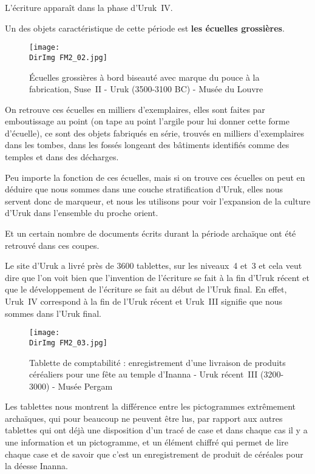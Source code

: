 \documentclass[a4paper,10pt]{article}
\newcommand{\DirImg}{../img/FaivreMartin/}
\begin{document}
L'écriture apparaît dans la phase d'Uruk~IV.

Un des objets caractéristique de cette période est \textbf{les 
écuelles grossières}.

\begin{figure}
  \centering
  \texttt{[image: \\DirImg FM2\_02.jpg]}
  \caption{\'Ecuelles grossières à bord biseauté avec marque du pouce 
           à la fabrication, Suse~II - Uruk (3500-3100 BC) - Musée du 
           Louvre}
  \label{}
\end{figure}

On retrouve ces écuelles en milliers d'exemplaires, elles sont faites 
par emboutissage au point (on tape au point l'argile pour lui donner 
cette forme d'écuelle), ce sont des objets fabriqués en série, trouvés 
en milliers d'exemplaires dans les tombes, dans les fossés longeant des 
bâtiments identifiés comme des temples et dans des décharges.

Peu importe la fonction de ces écuelles, mais si on trouve ces écuelles 
on peut en déduire que nous sommes dans une couche stratification d'Uruk, 
elles nous servent donc de marqueur, et nous les utilisons pour voir 
l'expansion de la culture d'Uruk dans l'ensemble du proche orient.

Et un certain nombre de documents écrits durant la période archaïque ont 
été retrouvé dans ces coupes.

Le site d'Uruk a livré près de \si{3600} tablettes, sur les niveaux~4 et~3 
et cela veut dire que l'on voit bien que l'invention de l'écriture se fait 
à la fin d'Uruk récent et que le développement de l'écriture se fait au 
début de l'Uruk final. En effet, Uruk~IV correspond à la fin de l'Uruk 
récent et Uruk~III signifie que nous sommes dans l'Uruk final.

\begin{figure}
  \centering
  \texttt{[image: \\DirImg FM2\_03.jpg]}
  \caption{Tablette de comptabilité : enregistrement d'une livraison de 
           produits céréaliers pour une fête au temple d'Inanna - Uruk 
           récent~III (3200-3000) - Musée Pergam}
  \label{}
\end{figure}

Les tablettes nous montrent la différence entre les pictogrammes extrêmement 
archaïques, qui pour beaucoup ne peuvent être lus, par rapport aux autres 
tablettes qui ont déjà une disposition d'un tracé de case et dans chaque cas 
il y a une information et un pictogramme, et un élément chiffré qui permet 
de lire chaque case et de savoir que c'est un enregistrement de produit de 
céréales pour la déesse Inanna.
\end{document}
